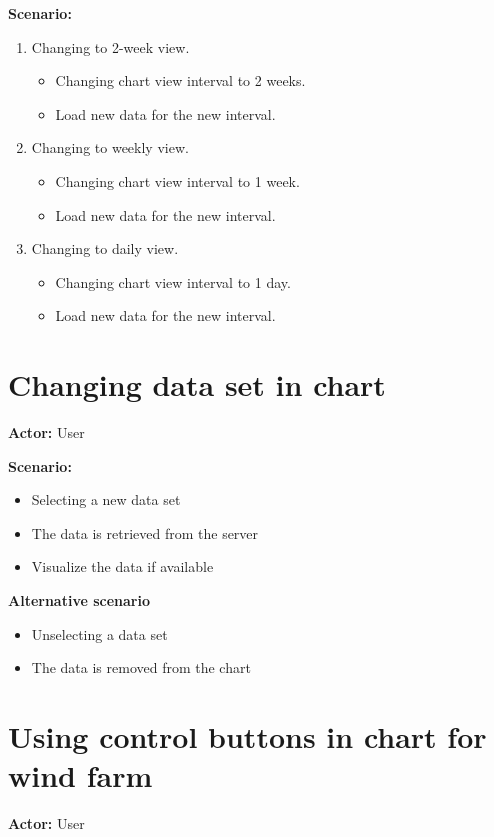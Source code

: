 \textbf{Scenario:}
\begin{enumerate}
\item Changing to 2-week view.
\begin{itemize}
\item Changing chart view interval to 2 weeks.
\item Load new data for the new interval.
\end{itemize}
\item Changing to weekly view.
\begin{itemize}
\item Changing chart view interval to 1 week.
\item Load new data for the new interval.
\end{itemize}
\item Changing to daily view.
\begin{itemize}
\item Changing chart view interval to 1 day.
\item Load new data for the new interval.
\end{itemize}
\end{enumerate}

\section{Changing data set in chart}
\textbf{Actor:} User

\textbf{Scenario:}
\begin{itemize}
\item Selecting a new data set
\item The data is retrieved from the server
\item Visualize the data if available
\end{itemize}
\textbf{Alternative scenario}
\begin{itemize}
\item Unselecting a data set
\item The data is removed from the chart
\end{itemize}

\section{Using control buttons in chart for wind farm}
\textbf{Actor:} User

